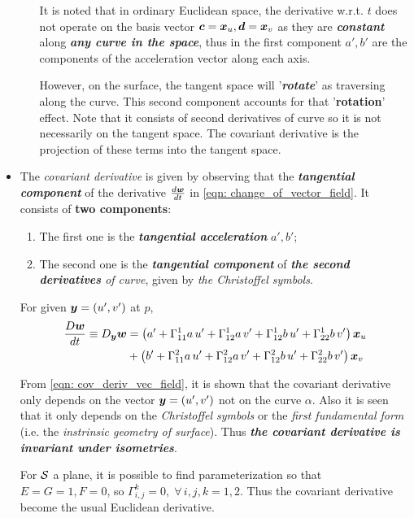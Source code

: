 \documentclass[11pt]{article}
\begin{document}
\begin{itemize}
\begin{itemize}
It is noted that in ordinary Euclidean space, the derivative w.r.t. $t$ does not operate on the basis vector $\boldsymbol{c}=\boldsymbol{x}_{u}, \boldsymbol{d} = \boldsymbol{x}_{v}$ as they are \emph{\textbf{constant}} along \emph{\textbf{any curve in the space}}, thus in the first component $a', b'$ are the components of the acceleration vector along each axis. 

However, on the surface, the tangent space will '\emph{\textbf{rotate}}' as traversing along the curve. This second component accounts for that '\textbf{rotation}' effect. Note that it consists of second derivatives of curve so it is not necessarily on the tangent space. The covariant derivative is the projection of these terms into the tangent space. 
\end{itemize}

\item The \emph{covariant derivative} is given by observing that the \emph{\textbf{tangential component}} of the derivative $\frac{d\boldsymbol{w}}{dt}$ in \eqref{eqn: change_of_vector_field}. It consists of \textbf{two components}: 
\begin{enumerate}
\item The first one is the \emph{\textbf{tangential acceleration}} $a', b'$;
\item The second one is the \emph{\textbf{tangential component}} of \emph{\textbf{the second derivatives} of curve}, given by \emph{the Christoffel symbols}.
\end{enumerate}
For given $\boldsymbol{y}= (u', v') $ at $p$, 
\begin{align}
\frac{D\boldsymbol{w}}{dt} \equiv D_{\boldsymbol{y}}\boldsymbol{w} &= \left(a' + \Gamma_{11}^{1}a\,u' + \Gamma_{12}^{1}a\,v' + \Gamma_{12}^{1}b\,u' +  \Gamma_{22}^{1}b\,v' \right) \boldsymbol{x}_{u} \nonumber\\
&+ \left(b' + \Gamma_{11}^{2}a\,u' + \Gamma_{12}^{2}a\,v' + \Gamma_{12}^{2}b\,u' +  \Gamma_{22}^{2}b\,v' \right) \boldsymbol{x}_{v}    \label{eqn: cov_deriv_vec_field}
\end{align} 

From \eqref{eqn: cov_deriv_vec_field}, it is shown that the covariant derivative only depends on the vector $\boldsymbol{y} = (u', v')$ not on the curve $\alpha$. Also it is seen that it only depends on the \emph{Christoffel symbols} or the \emph{first fundamental form} (i.e. the \emph{instrinsic geometry of surface}). Thus \emph{\textbf{the covariant derivative is invariant under isometries}}.

For ${\mathcal S}$ a plane, it is possible to find parameterization so that $E=G=1, F=0$, so $\Gamma_{i,j}^{k} = 0, \;\forall \,i,j,k=1,2$. Thus the covariant derivative become the usual Euclidean derivative. 


\end{itemize}
\end{document}
